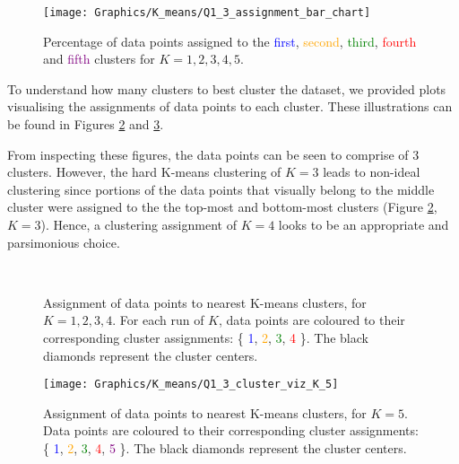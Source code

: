 \documentclass[a4paper,12pt]{article}
\begin{document}
\clearpage

\begin{figure}[!htb]
\centering
\texttt{[image: Graphics/K\_means/Q1\_3\_assignment\_bar\_chart]}
\caption{Percentage of data points assigned to the \textcolor{blue}{first}, \textcolor{orange}{second}, \textcolor{green}{third}, \textcolor{red}{fourth} and \textcolor{purple}{fifth} clusters for $K = 1, 2, 3, 4, 5$.}
\label{fig:K_means/Q1_3_assignment_bar_chart}
\end{figure}

To understand how many clusters to best cluster the dataset, we provided plots visualising the assignments of data points to each cluster. These illustrations can be found in Figures \ref{fig:K_means/Q1_3_cluster_viz_first} and \ref{fig:K_means/Q1_3_cluster_viz_second}.

From inspecting these figures, the data points can be seen to comprise of 3 clusters. However, the hard K-means clustering of $K = 3$ leads to non-ideal clustering since portions of the data points that visually belong to the middle cluster were assigned to the the top-most and bottom-most clusters (Figure \ref{fig:K_means/Q1_3_cluster_viz_first}, $K = 3$). Hence, a clustering assignment of $K = 4$ looks to be an appropriate and parsimonious choice.

\begin{figure}[!htb]
\centering
{}
 \\
\caption{Assignment of data points to nearest K-means clusters, for $K = 1, 2, 3, 4$. For each run of $K$, data points are coloured to their corresponding cluster assignments: \{ \textcolor{blue}{1}, \textcolor{orange}{2}, \textcolor{green}{3}, \textcolor{red}{4} \}. The black diamonds represent the cluster centers.}
\label{fig:K_means/Q1_3_cluster_viz_first}
\end{figure}

\begin{figure}[!htb]
\centering
\texttt{[image: Graphics/K\_means/Q1\_3\_cluster\_viz\_K\_5]}
\caption{Assignment of data points to nearest K-means clusters, for $K = 5$. Data points are coloured to their corresponding cluster assignments: \{ \textcolor{blue}{1}, \textcolor{orange}{2}, \textcolor{green}{3}, \textcolor{red}{4}, \textcolor{purple}{5} \}. The black diamonds represent the cluster centers.}
\label{fig:K_means/Q1_3_cluster_viz_second}
\end{figure}
\end{document}
